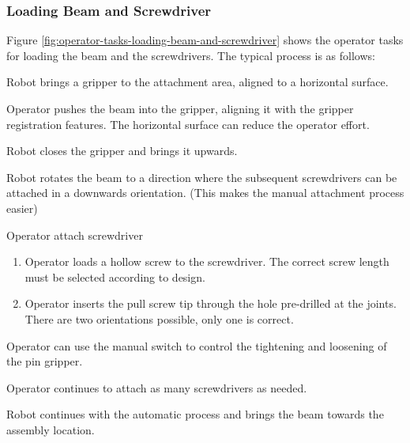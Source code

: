 \FloatBarrier

\subsubsection{Loading Beam and Screwdriver}
\label{subsubsection:exploration-4-loading-beam-and-screwdriver}

Figure \ref{fig:operator-tasks-loading-beam-and-screwdriver} shows the operator tasks for loading the beam and the screwdrivers. The typical process is as follows: 
\begin{description}[leftmargin=\parindent,labelindent=\parindent]
    \item [Step 1] Robot brings a gripper to the attachment area, aligned to a horizontal surface.
    \item [Step 2] Operator pushes the beam into the gripper, aligning it with the gripper registration features. The horizontal surface can reduce the operator effort.
    \item [Step 3] Robot closes the gripper and brings it upwards.
    \item [Step 4] Robot rotates the beam to a direction where the subsequent screwdrivers can be attached in a downwards orientation. (This makes the manual attachment process easier)
    \item [Step 5] Operator attach screwdriver
    \begin{enumerate}[nosep]
        \item Operator loads a hollow screw to the screwdriver. The correct screw length must be selected according to design.
        \item Operator inserts the pull screw tip through the hole pre-drilled at the joints. There are two orientations possible, only one is correct.
    \end{enumerate}
    \item [Step 6] Operator can use the manual switch to control the tightening and loosening of the pin gripper.
    \item [Step 7] Operator continues to attach as many screwdrivers as needed.
    \item [Step 8] Robot continues with the automatic process and brings the beam towards the assembly location.
\end{description}

